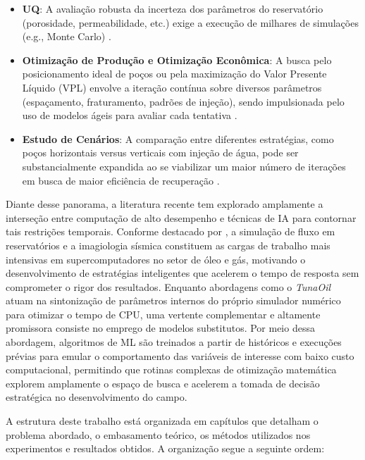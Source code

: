 \begin{itemize}

\item \textbf{\gls{UQ}}: A avaliação robusta da incerteza dos parâmetros do reservatório (porosidade, permeabilidade, etc.) exige a execução de milhares de simulações (e.g., Monte Carlo) \cite{Wu_2025_OptimizationWellPatterns}.

\item \textbf{Otimização de Produção e Otimização Econômica}: A busca pelo posicionamento ideal de poços ou pela maximização do Valor Presente Líquido (VPL) envolve a iteração contínua sobre diversos parâmetros (espaçamento, fraturamento, padrões de injeção), sendo impulsionada pelo uso de modelos ágeis para avaliar cada tentativa \cite{Wu_2025_OptimizationWellPatterns}.

\item \textbf{Estudo de Cenários}: A comparação entre diferentes estratégias, como poços horizontais versus verticais com injeção de água, pode ser substancialmente expandida ao se viabilizar um maior número de iterações em busca de maior eficiência de recuperação \cite{Sikanyika_2023_Numerical}.

\end{itemize}

Diante desse panorama, a literatura recente tem explorado amplamente a interseção entre computação de alto desempenho e técnicas de \gls{IA} para contornar tais restrições temporais. Conforme destacado por , a simulação de fluxo em reservatórios e a imagiologia sísmica constituem as cargas de trabalho mais intensivas em supercomputadores no setor de óleo e gás, motivando o desenvolvimento de estratégias inteligentes que acelerem o tempo de resposta sem comprometer o rigor dos resultados. Enquanto abordagens como o \textit{TunaOil} atuam na sintonização de parâmetros internos do próprio simulador numérico para otimizar o tempo de CPU, uma vertente complementar e altamente promissora consiste no emprego de modelos substitutos. Por meio dessa abordagem, algoritmos de \gls{ML} são treinados a partir de históricos e execuções prévias para emular o comportamento das variáveis de interesse com baixo custo computacional, permitindo que rotinas complexas de otimização matemática explorem amplamente o espaço de busca e acelerem a tomada de decisão estratégica no desenvolvimento do campo.

A estrutura deste trabalho está organizada em capítulos que detalham o problema abordado, o embasamento teórico, os métodos utilizados nos experimentos e resultados obtidos. A organização segue a seguinte ordem:

